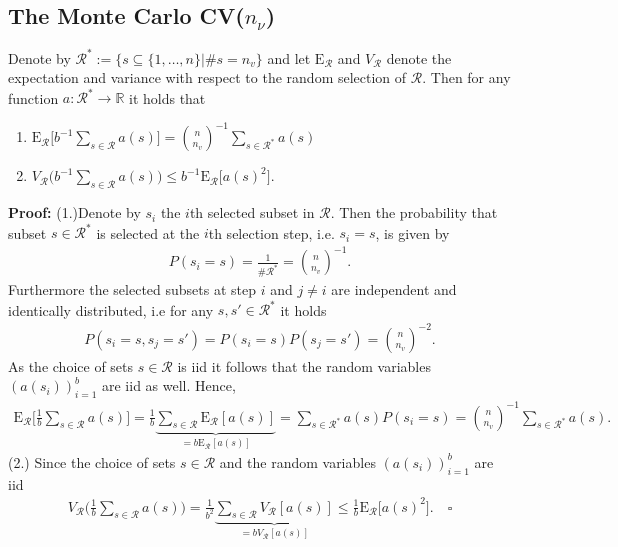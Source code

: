 \documentclass[Research_Module_ES.tex]{subfiles}
\begin{document}
\subsection{The Monte Carlo CV($n_\nu$)}

\begin{lemma} Denote by $\mathcal{R}^\ast:= \{s\subseteq\{1,\dots,n\}|\# s=n_v\}$ and let $\mathrm{E}_\mathcal{R}$ and $V_\mathcal{R}$ denote the expectation and variance with respect to the random selection of $\mathcal{R}$. Then for any function $a:\mathcal{R}^\ast\to \mathbb{R}$ it holds that
\begin{enumerate}
\item $\mathrm{E}_\mathcal{R} \bigl[ b^{-1}\sum_{s\in \mathcal{R}}a(s)\bigr] = \binom{n}{n_v}^{-1}\sum_{s\in\mathcal{R}^\ast}a(s)$
\item $V_\mathcal{R} \bigl( b^{-1}\sum_{s\in \mathcal{R}}a(s)\bigr) \le b^{-1} \mathrm{E}_\mathcal{R} \bigl[a(s)^2\bigr]$.
\end{enumerate}
\end{lemma}
\textbf{Proof:}
(1.)Denote by $s_i$ the $i$th selected subset in $\mathcal{R}$. Then the probability that subset $s \in \mathcal{R}^\ast$ is selected at the $i$th selection step, i.e. $s_i=s$, is given by
\begin{align*}
P(s_i=s)= \frac{1}{\# \mathcal{R}^\ast} = \binom{n}{n_v}^{-1}.
\end{align*}
Furthermore the selected subsets at step $i$ and $j\neq i$ are independent and identically distributed, i.e for any $s,s'\in \mathcal{R}^\ast$ it holds
\begin{align*}
P(s_i=s,s_j=s')=P(s_i=s)P(s_j=s')=\binom{n}{n_v}^{-2}.
\end{align*}
As the choice of sets $s\in \mathcal{R}$ is iid it follows that the random variables $(a(s_i))_{i=1}^b$ are iid as well. Hence, 
\begin{align*}
\mathrm{E}_\mathcal{R} \biggl[ \frac{1}{b}\sum_{s\in \mathcal{R}}a(s)\biggr] 
= \frac{1}{b}\underbrace{\sum_{s\in \mathcal{R}}\mathrm{E}_\mathcal{R} [a(s)]}_{=b\mathrm{E}_\mathcal{R}[a(s)]}
= \sum_{s\in \mathcal{R}^\ast}a(s)P(s_i = s)
=\binom{n}{n_v}^{-1}\sum_{s\in\mathcal{R}^\ast}a(s).
\end{align*}
(2.) Since the choice of sets $s\in \mathcal{R}$ and the random variables $(a(s_i))_{i=1}^b$ are iid
\begin{align*}
V_\mathcal{R} \biggl(\frac{1}{b}\sum_{s\in \mathcal{R}}a(s)\biggr)
= \frac{1}{b^2}\underbrace{\sum_{s\in \mathcal{R}}V_\mathcal{R} [a(s)]}_{=bV_\mathcal{R} [a(s)]}
\le \frac{1}{b}\mathrm{E}_\mathcal{R}\bigl[a(s)^2\bigr]. \quad \square
\end{align*}
\end{document}
